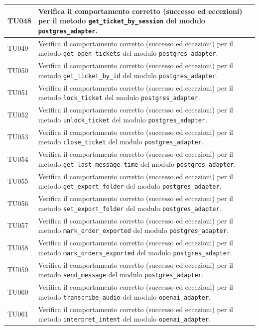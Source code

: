 \documentclass[a4paper,11pt,oneside]{scrartcl}
\begin{document}
\begin{longtable}{|p{1.9cm}|p{11.6cm}|c|}
TU048 & Verifica il comportamento corretto (successo ed eccezioni) per il metodo \texttt{get\_ticket\_by\_session} del modulo \texttt{postgres\_adapter}. & \\ \hline
TU049 & Verifica il comportamento corretto (successo ed eccezioni) per il metodo \texttt{get\_open\_tickets} del modulo \texttt{postgres\_adapter}. & \\ \hline
TU050 & Verifica il comportamento corretto (successo ed eccezioni) per il metodo \texttt{get\_ticket\_by\_id} del modulo \texttt{postgres\_adapter}. & \\ \hline
TU051 & Verifica il comportamento corretto (successo ed eccezioni) per il metodo \texttt{lock\_ticket} del modulo \texttt{postgres\_adapter}. & \\ \hline
TU052 & Verifica il comportamento corretto (successo ed eccezioni) per il metodo \texttt{unlock\_ticket} del modulo \texttt{postgres\_adapter}. & \\ \hline
TU053 & Verifica il comportamento corretto (successo ed eccezioni) per il metodo \texttt{close\_ticket} del modulo \texttt{postgres\_adapter}. & \\ \hline
TU054 & Verifica il comportamento corretto (successo ed eccezioni) per il metodo \texttt{get\_last\_message\_time} del modulo \texttt{postgres\_adapter}. & \\ \hline
TU055 & Verifica il comportamento corretto (successo ed eccezioni) per il metodo \texttt{get\_export\_folder} del modulo \texttt{postgres\_adapter}. & \\ \hline
TU056 & Verifica il comportamento corretto (successo ed eccezioni) per il metodo \texttt{set\_export\_folder} del modulo \texttt{postgres\_adapter}. & \\ \hline
TU057 & Verifica il comportamento corretto (successo ed eccezioni) per il metodo \texttt{mark\_order\_exported} del modulo \texttt{postgres\_adapter}. & \\ \hline
TU058 & Verifica il comportamento corretto (successo ed eccezioni) per il metodo \texttt{mark\_orders\_exported} del modulo \texttt{postgres\_adapter}. & \\ \hline
TU059 & Verifica il comportamento corretto (successo ed eccezioni) per il metodo \texttt{send\_message} del modulo \texttt{postgres\_adapter}. & \\ \hline
TU060 & Verifica il comportamento corretto (successo ed eccezioni) per il metodo \texttt{transcribe\_audio} del modulo \texttt{openai\_adapter}. & \\ \hline
TU061 & Verifica il comportamento corretto (successo ed eccezioni) per il metodo \texttt{interpret\_intent} del modulo \texttt{openai\_adapter}. & \\ \hline

\end{longtable}
\end{document}
